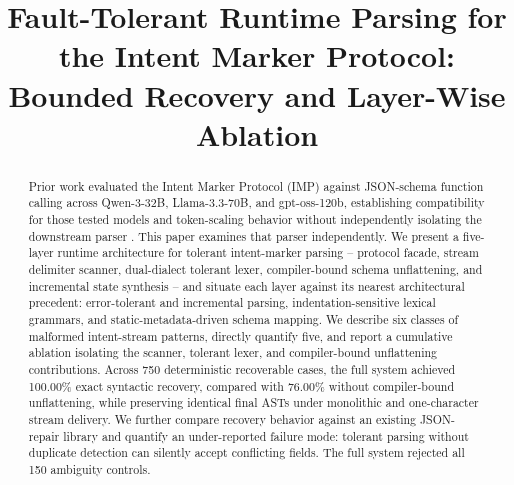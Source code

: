 \documentclass[conference]{IEEEtran}
\begin{document}
\title{Fault-Tolerant Runtime Parsing for the Intent Marker Protocol: \\
Bounded Recovery and Layer-Wise Ablation}

\author{
\and
{}
\and
{}
\and
{}
}

\maketitle

\begin{abstract}
Prior work evaluated the Intent Marker Protocol (IMP) against JSON-schema
function calling across Qwen-3-32B, Llama-3.3-70B, and gpt-oss-120b,
establishing compatibility for those tested models and token-scaling behavior
without independently isolating the downstream parser \cite{irai2026}. This
paper examines that parser independently. We present a five-layer
runtime architecture for tolerant intent-marker parsing -- protocol
facade, stream delimiter scanner, dual-dialect tolerant lexer,
compiler-bound schema unflattening, and incremental state synthesis --
and situate each layer against its nearest architectural precedent:
error-tolerant and incremental parsing, indentation-sensitive lexical
grammars, and static-metadata-driven schema mapping. We describe six classes
of malformed intent-stream patterns, directly quantify five, and report a
cumulative ablation isolating the scanner, tolerant lexer, and compiler-bound
unflattening contributions. Across 750 deterministic recoverable cases, the
full system achieved 100.00\% exact syntactic recovery, compared with
76.00\% without compiler-bound unflattening, while preserving identical
final ASTs under monolithic and one-character stream delivery. We further
compare recovery behavior against an existing JSON-repair library and
quantify an under-reported failure mode: tolerant parsing without duplicate
detection can silently accept conflicting fields. The full
system rejected all 150 ambiguity controls.
\end{abstract}
\end{document}

